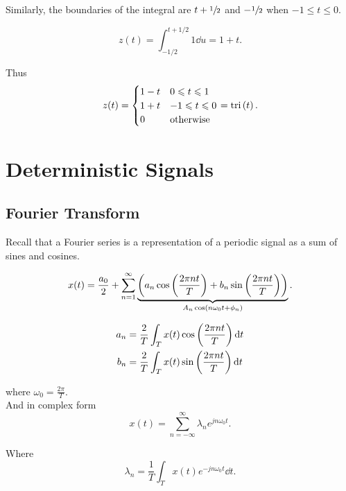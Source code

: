 \documentclass{report}
\DeclareMathOperator{\tri}{tri}
\begin{document}
{\begin{figure}[H]
	\end{figure}

	Similarly, the boundaries of the integral are $t+\sfrac{1}{2}$ and $-\sfrac{1}{2}$ when $-1\leq t\leq 0$.

	\[
		z(t) = \int_{-1/2}^{t+1/2} 1 \dd{u} = 1 + t
		.\]

	Thus
	\[
		z(t) = \begin{cases}
			1-t & 0\leq t\leq 1    \\
			1+t & -1\leq t\leq 0   \\
			0   & \text{otherwise}
		\end{cases}
		= \tri\lt(t\rt)
		.\]
}

\chapter{Deterministic Signals}

\section{Fourier Transform}

Recall that a Fourier series is a representation of a periodic signal as a sum of sines and cosines.

\[
	x(t) = \frac{a_0}{2} + \sum_{n=1}^{\infty} \underbrace{\left( a_n\cos\left(\frac{2\pi nt}{T}\right) + b_n\sin\left(\frac{2\pi nt}{T}\right) \right)}_{
		A_n\cos\left(n\omega_0t + \phi_n\right)
	}
	.\]

\begin{align*}
	a_n & = \frac{2}{T}\int_{T} x(t)\cos\left(\frac{2\pi nt}{T}\right) \dd{t} \\
	b_n & = \frac{2}{T}\int_{T} x(t)\sin\left(\frac{2\pi nt}{T}\right) \dd{t}
\end{align*}

where $\omega_0 = \frac{2\pi}{T}$.\\

And in complex form
\[
	x(t) = \sum_{n=-\infty}^{\infty} \lambda_n e^{jn\omega_0t}
	.\]

Where
\[
	\lambda_n = \frac{1}{T}\int_{T} x(t)e^{-jn\omega_0t} \dd{t}
	.\]
\end{document}
